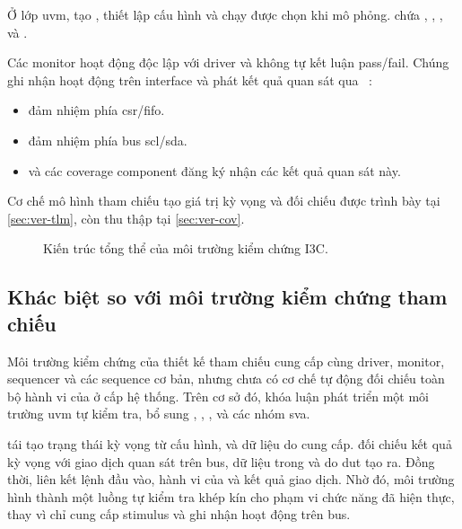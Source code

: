 Ở lớp \gls{uvm}, \IThreeCBaseTest{} tạo \IThreeCEnvironment{}, thiết lập cấu hình và chạy
\VirtualSequence{} được chọn khi mô phỏng. \IThreeCEnvironment{} chứa \RegisterAgent{},
\IThreeCAgent{}, \VirtualSequencer{}, \Scoreboard{} và \CorrelatedCoverage{}.

Các monitor hoạt động độc lập với driver và không tự kết luận pass/fail. Chúng ghi nhận hoạt động
trên interface và phát kết quả quan sát qua \TLMAnalysisPort{}~\cite{uvm12_ref}:
\begin{itemize}
	\item \RegisterMonitor{} đảm nhiệm phía \gls{csr}/\gls{fifo}.
	\item \IThreeCMonitor{} đảm nhiệm phía bus \gls{scl}/\gls{sda}.
	\item \Scoreboard{} và các coverage component đăng ký nhận các kết quả quan sát này.
\end{itemize}
Cơ chế mô hình tham chiếu tạo giá trị kỳ vọng và đối chiếu được trình bày tại
\cref{sec:ver-tlm}, còn thu thập \FunctionalCoverage{} tại \cref{sec:ver-cov}.

\begin{figure}[!htbp]
	\centering
	
	\caption{Kiến trúc tổng thể của môi trường kiểm chứng I3C.}
	\label{fig:tb-arch}
\end{figure}

\subsection{Khác biệt so với môi trường kiểm chứng tham chiếu}

Môi trường kiểm chứng của thiết kế tham chiếu cung cấp \IThreeCAgent{} cùng driver, monitor,
sequencer và các sequence cơ bản, nhưng chưa có cơ chế tự động đối chiếu toàn bộ hành vi của
\Controller{} ở cấp hệ thống. Trên cơ sở đó, khóa luận phát triển một môi trường \gls{uvm} tự kiểm tra,
bổ sung \RegisterAgent{}, \Scoreboard{}, \ReferenceModel{}, \CorrelatedCoverage{} và các nhóm \gls{sva}.

\ReferenceModel{} tái tạo trạng thái kỳ vọng từ cấu hình, \CommandDescriptor{} và dữ liệu do
\Host{} cung cấp. \Scoreboard{} đối chiếu kết quả kỳ vọng với giao dịch quan sát trên bus, dữ liệu
trong \RxFifo{} và \ResponseDescriptor{} do \gls{dut} tạo ra. Đồng thời, \CorrelatedCoverage{} liên kết
lệnh đầu vào, hành vi của \Target{} và kết quả giao dịch. Nhờ đó, môi trường hình thành một luồng
tự kiểm tra khép kín cho phạm vi chức năng đã hiện thực, thay vì chỉ cung cấp stimulus và ghi nhận
hoạt động trên bus.

